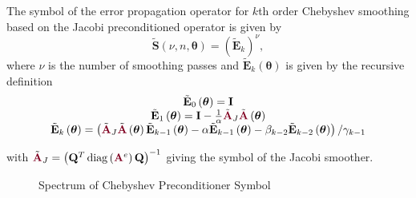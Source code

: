 \begin{definition}
The symbol of the error propagation operator for $k$th order Chebyshev smoothing based on the Jacobi preconditioned operator is given by
\begin{equation}
\tilde{\mathbf{S}} \left( \nu, n, \boldsymbol{\theta} \right) = \left( \tilde{\mathbf{E}}_k \right)^\nu,
\end{equation}
where $\nu$ is the number of smoothing passes and $\tilde{\mathbf{E}}_k \left( \boldsymbol{\theta} \right)$ is given by the recursive definition
\begin{equation}
\begin{tabular}{c}
$\tilde{\mathbf{E}}_0 \left( \boldsymbol{\theta} \right) = \mathbf{I}$\\
$\tilde{\mathbf{E}}_1 \left( \boldsymbol{\theta} \right) = \mathbf{I} - \frac{1}{\alpha} \tilde{\color{burgundy}\mathbf{A}}_J \tilde{\color{burgundy}\mathbf{A}} \left( \boldsymbol{\theta} \right)$\\
$\tilde{\mathbf{E}}_k \left( \boldsymbol{\theta} \right) = \left( \tilde{\color{burgundy}\mathbf{A}}_J \tilde{\color{burgundy}\mathbf{A}} \left( \boldsymbol{\theta} \right) \tilde{\mathbf{E}}_{k - 1} \left( \boldsymbol{\theta} \right) - \alpha \tilde{\mathbf{E}}_{k - 1} \left( \boldsymbol{\theta} \right) - \beta_{k - 2} \tilde{\mathbf{E}}_{k - 2} \left( \boldsymbol{\theta} \right) \right) / \gamma_{k - 1}$
\end{tabular}
\end{equation}
\label{def:chebyshev_symbol}
\end{definition}
with $\tilde{\color{burgundy}\mathbf{A}}_J = \left( \mathbf{Q}^T \diag \left( {\color{burgundy}\mathbf{A}}^e \right) \mathbf{Q} \right)^{-1}$ giving the symbol of the Jacobi smoother.

\begin{figure}[!ht]
  \centering
  \hfill
  \caption{Spectrum of Chebyshev Preconditioner Symbol}
\end{figure}


